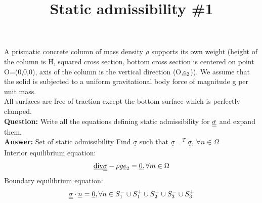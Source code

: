 \documentclass[letter,12pt]{article}
\begin{document}
\pagestyle{fancy}

\title{\textbf{Static admissibility \#1}}
\date{}

\maketitle

\vspace{-1cm}


A prismatic concrete column of mass density $\rho$ supports its own weight (height of the column is H, squared cross section, bottom cross section is centered on point O=(0,0,0), axis of the column is the vertical direction (O,$\underline{e}_2$)).  We assume that the solid is subjected to a uniform gravitational body force of magnitude g per unit mass. \\

All surfaces are free of traction except the bottom surface which is perfectly clamped. \\

\noindent \textbf{Question:} Write all the equations defining static admissibility  for $\underline{\underline{\sigma}}$ and expand them.\\

\noindent \textbf{Answer:} Set of static admissibility
Find $\underline{\underline{\sigma}}$ such that $\underline{\underline{\sigma}} =^T\underline{\underline{\sigma}} $,  $\forall n \in \Omega$ \\
Interior equilibrium equation: 
\begin{equation}
\underline{\text{div}} \underline{\underline{\sigma}} -\rho g \underline{e}_{2} = \underline{0}, \forall m \in \Omega
\end{equation}
Boundary equilibrium equation: 
\begin{equation}
\underline{\underline{\sigma}} \cdot \underline{n} = \underline{0}, \forall n \in S_{1}^{-} \cup S_{1}^{+} \cup S_{2}^{+} \cup S_{3}^{-} \cup S_{3}^{+}
\end{equation}
\end{document}

